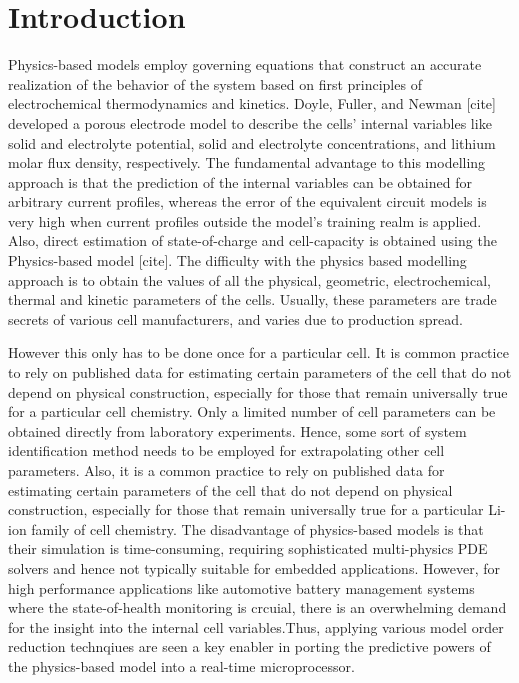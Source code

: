 \section{Introduction}





Physics-based models employ governing equations that construct an
accurate realization of the behavior of the system based on first
principles of electrochemical thermodynamics and kinetics. Doyle,
Fuller, and Newman {[}cite{]} developed a porous electrode model to
describe the cells\textquoteright{} internal variables like solid
and electrolyte potential, solid and electrolyte concentrations, and
lithium molar flux density, respectively. The fundamental advantage
to this modelling approach is that the prediction of the internal
variables can be obtained for arbitrary current profiles, whereas
the error of the equivalent circuit models is very high when current
profiles outside the model\textquoteright s training realm is applied.
Also, direct estimation of state-of-charge and cell-capacity is obtained
using the Physics-based model {[}cite{]}. The difficulty with the
physics based modelling approach is to obtain the values of all the
physical, geometric, electrochemical, thermal and kinetic parameters
of the cells. Usually, these parameters are trade secrets of various
cell manufacturers, and varies due to production spread.

However this only has to be done once for a particular cell. It is
common practice to rely on published data for estimating certain parameters
of the cell that do not depend on physical construction, especially
for those that remain universally true for a particular cell chemistry.
Only a limited
number of cell parameters can be obtained directly from laboratory
experiments. Hence, some sort of system identification method needs
to be employed for extrapolating other cell parameters. Also, it is
a common practice to rely on published data for estimating certain
parameters of the cell that do not depend on physical construction,
especially for those that remain universally true for a particular
Li-ion family of cell chemistry. The disadvantage of physics-based
models is that their simulation is time-consuming, requiring sophisticated
multi-physics PDE solvers and hence not typically suitable for embedded
applications. However, for high performance applications like automotive
battery management systems where the state-of-health monitoring is
crcuial, there is an overwhelming demand for the insight into the
internal cell variables.Thus, applying various model order reduction
technqiues are seen a key enabler in porting the predictive powers
of the physics-based model into a real-time microprocessor.

